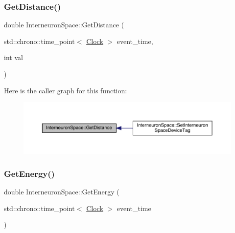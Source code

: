 \mbox{\label{class_interneuron_space_a634322f8b405ead2dc51afb0a5c3d725}} 
\subsubsection{\texorpdfstring{Get\+Distance()}{GetDistance()}}
{\footnotesize\ttfamily double Interneuron\+Space\+::\+Get\+Distance (\begin{DoxyParamCaption}\item[{std\+::chrono\+::time\+\_\+point$<$ \hyperlink{universe_8h_a0ef8d951d1ca5ab3cfaf7ab4c7a6fd80}{Clock} $>$}]{event\+\_\+time,  }\item[{int}]{val }\end{DoxyParamCaption})}

Here is the caller graph for this function\+:\nopagebreak
\begin{figure}[H]
\begin{center}
\leavevmode
\includegraphics[width=350pt]{class_interneuron_space_a634322f8b405ead2dc51afb0a5c3d725_icgraph}
\end{center}
\end{figure}
\mbox{\label{class_interneuron_space_a677430712211956219767d4fa71d20e6}} 
\subsubsection{\texorpdfstring{Get\+Energy()}{GetEnergy()}}
{\footnotesize\ttfamily double Interneuron\+Space\+::\+Get\+Energy (\begin{DoxyParamCaption}\item[{std\+::chrono\+::time\+\_\+point$<$ \hyperlink{universe_8h_a0ef8d951d1ca5ab3cfaf7ab4c7a6fd80}{Clock} $>$}]{event\+\_\+time }\end{DoxyParamCaption})\hspace{0.3cm}{\ttfamily [inline]}}



